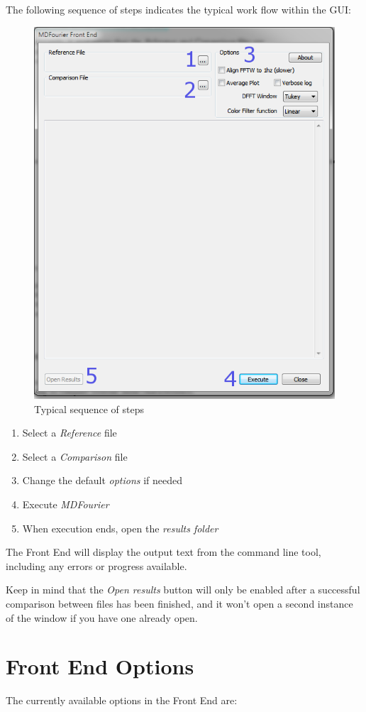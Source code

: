 \documentclass[10pt,a4paper]{report}
\begin{document}
The following sequence of steps indicates the typical work flow within the GUI:

\begin{figure}[H]
	\centering
	\includegraphics[width=0.6\linewidth]{plots/GUI2.png}
	\caption[Steps]{Typical sequence of steps}
	\label{fig:gui2}
\end{figure}

\begin{enumerate}
	\item Select a \textit{Reference} file
	\item Select a \textit{Comparison} file
	\item Change the default \textit{options} if needed
	\item Execute \textit{MDFourier}
	\item When execution ends, open the \textit{results folder}
\end{enumerate}

The Front End will display the output text from the command line tool, including any errors or progress available.

Keep in mind that the \textit{Open results} button will only be enabled after a successful comparison between files has been finished, and it won't open a second instance of the window if you have one already open.

\section{Front End Options}

The currently available options in the Front End are:
\end{document}
